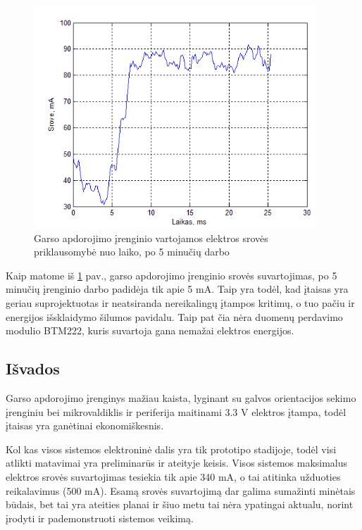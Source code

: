 \documentclass[]{vgtuef}
\begin{document}
{\begin{figure}[htbp]
  \centering
  \includegraphics[width=400px]{img/sound_energy_5min.png}
  \caption{Garso apdorojimo įrenginio vartojamos elektros srovės priklausomybė nuo laiko, po 5 minučių darbo}
  \label{fig:sound_energy_5min}
\end{figure}

Kaip matome iš \ref{fig:sound_energy_5min} pav., garso apdorojimo įrenginio srovės suvartojimas, po 5 minučių įrenginio darbo padidėja tik apie 5 mA. Taip yra todėl, kad įtaisas yra geriau suprojektuotas ir neatsiranda nereikalingų įtampos kritimų, o tuo pačiu ir energijos išsklaidymo šilumos pavidalu. Taip pat čia nėra duomenų perdavimo modulio BTM222, kuris suvartoja gana nemažai elektros energijos.

\newpage

\subsection{Išvados}

Garso apdorojimo įrenginys mažiau kaista, lyginant su galvos orientacijos sekimo įrenginiu bei mikrovaldiklis ir periferija maitinami 3.3 V elektros įtampa, todėl įtaisas yra ganėtinai ekonomiškesnis.

Kol kas visos sistemos elektroninė dalis yra tik prototipo stadijoje, todėl visi atlikti matavimai yra preliminarūs ir ateityje keisis. Visos sistemos maksimalus elektros srovės suvartojimas tesiekia tik apie 340 mA, o tai atitinka užduoties reikalavimus (500 mA). Esamą srovės suvartojimą dar galima sumažinti minėtais būdais, bet tai yra ateities planai ir šiuo metu tai nėra ypatingai aktualu, norint įrodyti ir pademonstruoti sistemos veikimą.


}
\end{document}
